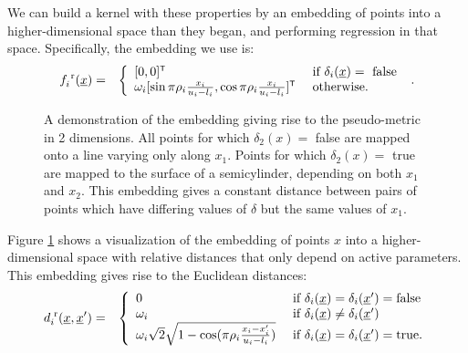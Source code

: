 \documentclass{article}
\newcommand{\vect}[1]{\underline{\smash{#1}}}
\renewcommand{\v}[1]{\vect{#1}}
\newcommand{\reals}{\mathds{R}}
\newcommand{\sX}{\mathcal{X}}
\newcommand{\br}{^{\text{\textnormal{ r}}}}
\newcommand\transpose{{\textrm{\tiny{\sf{T}}}}}
\begin{document}
We can build a kernel with these properties by an embedding of points into a higher-dimensional space than they began, and performing regression in that space.  Specifically, the embedding we use is:
%
%
%
\begin{eqnarray}
\nonumber{}f_i\br(\v{x}) & = & \left\{\begin{array}{ll}
[0,0]^\transpose & \textrm{ if } \delta_i(\v{x}) = \textrm{ false }\\
\nonumber{} \omega_i [\sin{\pi\rho_i\frac{x_i}{u_i-l_i}}, \cos{\pi\rho_i\frac{x_i}{u_i-l_i}}]^\transpose & \textrm{ otherwise.}\end{array}\right..
\end{eqnarray}
%
\begin{figure}

\caption{A demonstration of the embedding giving rise to the pseudo-metric in 2 dimensions.  All points for which $\delta_2(x) =$ false are mapped onto a line varying only along $x_1$.  Points for which $\delta_2(x) =$ true are mapped to the surface of a semicylinder, depending on both $x_1$ and $x_2$.  This embedding gives a constant distance between pairs of points which have differing values of $\delta$ but the same values of $x_1$.
}
\label{fig:cylinder}
\end{figure}
%
Figure \ref{fig:cylinder} shows a visualization of the embedding of points $x$ into a higher-dimensional space with relative distances that only depend on active parameters.
%
This embedding gives rise to the Euclidean distances:
%
\begin{eqnarray}
\nonumber{}d\br_i(\v{x}, \v{x}') & = & \left\{\begin{array}{ll}
\nonumber{} 0 & \textrm{ if } \delta_i(\v{x}) = \delta_i(\v{x}') = \textrm{false}\\
\nonumber{} \omega_i & \textrm{ if } \delta_i(\v{x}) \neq \delta_i(\v{x}')\\
\nonumber{} \omega_i \sqrt{2} \sqrt{1 - \cos(\pi\rho_i \frac{x_i-x_i'}{u_i-l_i})} & \textrm{ if } \delta_i(\v{x}) = \delta_i(\v{x}') = \textrm{true}. \end{array}\right.
\end{eqnarray}
\end{document}
